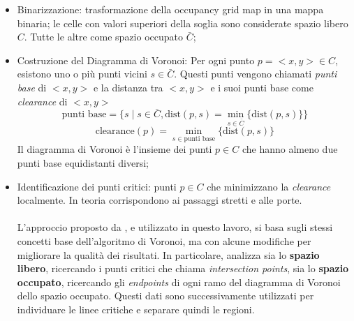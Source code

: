 \begin{itemize}
  \item Binarizzazione: trasformazione della occupancy grid map in una mappa binaria; le celle con valori superiori della soglia sono considerate spazio libero $C$. Tutte le altre come spazio occupato $\bar{C}$;
  \item Costruzione del Diagramma di Voronoi: Per ogni punto $p = <x, y> \in C$, esistono uno o più punti vicini $s \in \bar{C}$. Questi punti vengono chiamati \textit{punti base} di $<x, y>$ e la distanza tra $<x, y>$ e i suoi punti base come \textit{clearance} di $<x, y>$\\
        \begin{equation}
          \text{punti base} = \{s \mid s \in \bar{C}, \text{dist}(p, s) = \min_{s \in \bar{C}} \{\text{dist}(p,s)\}\}
        \end{equation}
        \begin{equation}
          \text{clearance}(p) = \min_{s \in \text{punti base}} \{\text{dist}(p,s)\}
        \end{equation}
        Il diagramma di Voronoi è l'insieme dei punti $p \in C$ che hanno almeno due punti base equidistanti diversi;
  \item Identificazione dei punti critici: punti $p \in C$ che minimizzano la \textit{clearance} localmente. In teoria corrispondono ai passaggi stretti e alle porte.\\\\
        L'approccio proposto da \cite{mora}, e utilizzato in questo lavoro, si basa sugli stessi concetti base dell'algoritmo di Voronoi, ma con alcune modifiche per migliorare la qualità dei risultati. In particolare, analizza sia lo \textbf{spazio libero}, ricercando i punti critici che chiama \textit{intersection points}, sia lo \textbf{spazio occupato}, ricercando gli \textit{endpoints} di ogni ramo del diagramma di Voronoi dello spazio occupato. Questi dati sono successivamente utilizzati per individuare le linee critiche e separare quindi le regioni.
\end{itemize}
